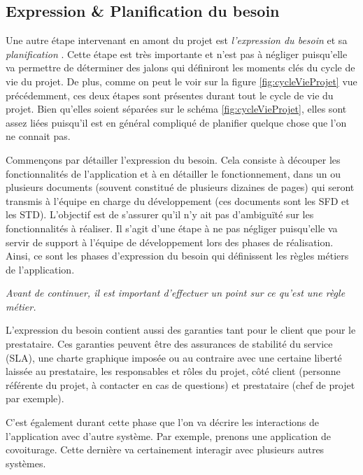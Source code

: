 \subsection{Expression \& Planification du besoin}

Une autre étape intervenant en amont du projet est \emph{l'expression du besoin} et sa \emph{planification} . Cette étape est très importante et n'est pas à négliger puisqu'elle va permettre de déterminer des jalons qui définiront les moments clés du cycle de vie du projet. De plus, comme on peut le voir sur la figure \ref{fig:cycleVieProjet} vue précédemment, ces deux étapes sont présentes durant tout le cycle de vie du projet. Bien qu'elles soient séparées sur le schéma \ref{fig:cycleVieProjet}, elles sont assez liées puisqu'il est en général compliqué de planifier quelque chose que l'on ne connait pas.

Commençons par détailler l'expression du besoin. Cela consiste à découper les fonctionnalités de l'application et à en détailler le fonctionnement, dans un ou plusieurs documents (souvent constitué de plusieurs dizaines de pages) qui seront transmis à l'équipe en charge du développement (ces documents sont les \gls{SFD} et les \gls{STD}). L'objectif est de s'assurer qu'il n'y ait pas d'ambiguïté sur les fonctionnalités à réaliser. Il s'agit d'une étape à ne pas négliger puisqu'elle va servir de support à l'équipe de développement lors des phases de réalisation. Ainsi, ce sont les phases d'expression du besoin qui définissent les règles métiers de l'application. 

{\em
Avant de continuer, il est important d'effectuer un point sur ce qu'est une règle métier. 
}


L'expression du besoin contient aussi des garanties tant pour le client que pour le prestataire. Ces garanties peuvent être des assurances de stabilité du service (\gls{SLA}), une charte graphique imposée ou au contraire avec une certaine liberté laissée au prestataire, les responsables et rôles du projet, côté client (personne référente du projet, à contacter en cas de questions) et prestataire (chef de projet par exemple).

C'est également durant cette phase que l'on va décrire les interactions de l'application avec d'autre système. Par exemple, prenons une application de covoiturage. Cette dernière va certainement interagir avec plusieurs autres systèmes.

